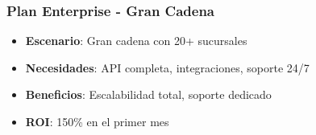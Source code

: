 \documentclass[12pt,a4paper]{article}
\begin{document}
\subsubsection{Plan Enterprise - Gran Cadena}

\begin{itemize}
    \item \textbf{Escenario}: Gran cadena con 20+ sucursales
    \item \textbf{Necesidades}: API completa, integraciones, soporte 24/7
    \item \textbf{Beneficios}: Escalabilidad total, soporte dedicado
    \item \textbf{ROI}: 150\% en el primer mes
\end{itemize}
\end{document}
